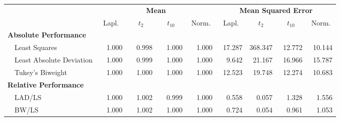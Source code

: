 %
\begin{center}
\begin{tabular}{|l||c|c|c|c||c|c|c|c|} \hline
\multicolumn{1}{|l||}{\bf }&\multicolumn{4}{c||}{\bf Mean}&\multicolumn{4}{c|}{\bf Mean Squared Error}\\ \cline{2-9}
\multicolumn{1}{|l||}{}&\multicolumn{1}{c|}{Lapl.}&\multicolumn{1}{c|}{$t_2$}&\multicolumn{1}{c|}{$t_{10}$}&\multicolumn{1}{c||}{Norm.}&\multicolumn{1}{c|}{Lapl.}&\multicolumn{1}{c|}{$t_2$}&\multicolumn{1}{c|}{$t_{10}$}&\multicolumn{1}{c|}{Norm.}\\ \hline
{\bf Absolute Performance}&&&&&&&&\\
~~Least Squares&~~1.000&~~0.998&~~1.000&~~1.000&~17.287&368.347&~12.772&~10.144\\ 
~~Least Absolute Deviation&~~1.000&~~0.999&~~1.000&~~1.000&~~9.642&~21.167&~16.966&~15.787\\ 
~~Tukey's Biweight&~~1.000&~~1.000&~~1.000&~~1.000&~12.523&~19.748&~12.274&~10.683\\ \hline
{\bf Relative Performance}&&&&&&&&\\
~~LAD/LS&~~1.000&~~1.002&~~0.999&~~1.000&~~0.558&~~0.057&~~1.328&~~1.556\\ 
~~BW/LS&~~1.000&~~1.002&~~1.000&~~1.000&~~0.724&~~0.054&~~0.961&~~1.053\\ 
\hline
\end{tabular}
\end{center}
